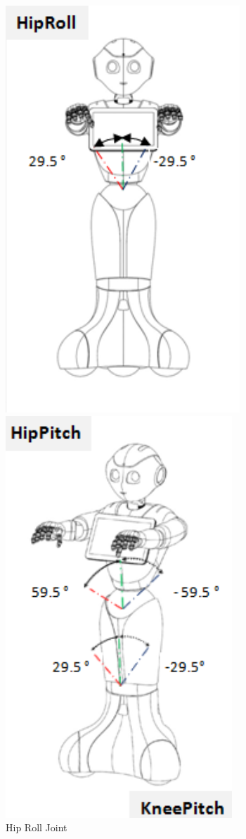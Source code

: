 \documentclass{CSSRforAfrica}
\begin{document}
\begin{figure}[!hbpt]
    \centering
    \begin{minipage}{0.45\textwidth}
        \centering
        \includegraphics[scale=0.45]{images/HipRoll.png}
        \caption{Hip Roll Joint \cite{PepperJoints}}
        \label{fig: Hip Roll joint}
    \end{minipage}\hfill
    \begin{minipage}{0.45\textwidth}
        \centering
        \includegraphics[scale=0.45]{images/HipPitchandKneePitch.png}

\end{minipage}
\end{figure}
\end{document}
